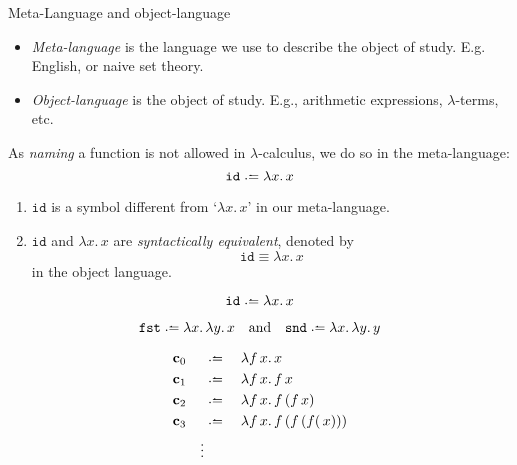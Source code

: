 \begin{frame}{Meta-Language and object-language}
  \begin{itemize}
    \item \emph{Meta-language} is the language we use to describe the object of
      study. E.g. English, or naive set theory. 
    \item \emph{Object-language} is the object of study. E.g., arithmetic
      expressions, $\lambda$-terms, etc.
  \end{itemize}
  As \emph{naming} a function is not allowed in $\lambda$-calculus, we do so
  in the meta-language:
    \[
      \mathtt{id} \defeq \lambda x.\, x
    \]
  \begin{enumerate}
    \item $\mathtt{id}$ is a symbol different from `$\lambda x.\,x$' in our meta-language.
    \item $\mathtt{id}$ and $\lambda x.\, x$ are \emph{syntactically equivalent}, denoted by
      \[
        \mathtt{id} \equiv \lambda x.\, x
      \]
      in the object language.
  \end{enumerate}
\end{frame}

\begin{frame}
  \begin{example}
    \[
      \mathtt{id} \defeq \lambda x.\, x
    \]
  \end{example}

  \begin{example}[Projections]
    \[
      \mathtt{fst} \defeq \lambda x.\, \lambda y.\, x
      \quad\text{and}\quad \mathtt{snd} \defeq \lambda x.\, \lambda y.\, y
    \]
  \end{example}
  \begin{example}
    \begin{align*}
      &\bc_{0}   &&\defeq \;&& \lambda f\,x.\, x \\
      &\bc_{1} &&\defeq \;&& \lambda f\,x.\, f\,x \\
      &\bc_{2} &&\defeq \;&& \lambda f\,x.\, f\,(f\,x) \\
      &\bc_{3} &&\defeq \;&& \lambda f\,x.\, f\,(f\,(f(\,x))) \\
      && \vdots 
    \end{align*}
  \end{example}
\end{frame}

